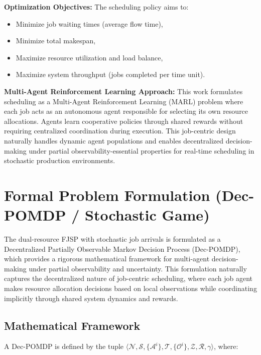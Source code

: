 \textbf{Optimization Objectives:}
The scheduling policy aims to:
\begin{itemize}
    \item Minimize job waiting times (average flow time),
    \item Minimize total makespan,
    \item Maximize resource utilization and load balance,
    \item Maximize system throughput (jobs completed per time unit).
\end{itemize}

\textbf{Multi-Agent Reinforcement Learning Approach:}
This work formulates scheduling as a Multi-Agent Reinforcement Learning (MARL) problem where each job acts as an autonomous agent responsible for selecting its own resource allocations. Agents learn cooperative policies through shared rewards without requiring centralized coordination during execution. This job-centric design naturally handles dynamic agent populations and enables decentralized decision-making under partial observability-essential properties for real-time scheduling in stochastic production environments.

\section{Formal Problem Formulation (Dec-POMDP / Stochastic Game)}
\label{sec:problemformulation}

The dual-resource FJSP with stochastic job arrivals is formulated as a Decentralized Partially Observable Markov Decision Process (Dec-POMDP), which provides a rigorous mathematical framework for multi-agent decision-making under partial observability and uncertainty. This formulation naturally captures the decentralized nature of job-centric scheduling, where each job agent makes resource allocation decisions based on local observations while coordinating implicitly through shared system dynamics and rewards.

\subsection{Mathematical Framework}
A Dec-POMDP is defined by the tuple \( \langle \mathcal{N}, \mathcal{S}, \{\mathcal{A}^i\}, \mathcal{T}, \{\mathcal{O}^i\}, \mathcal{Z}, \mathcal{R}, \gamma \rangle \), where:

